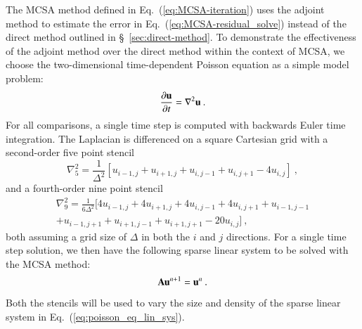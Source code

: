 \documentclass[preprint,12pt]{elsarticle}
\newcommand{\vA}{\ensuremath{\ve{A}}}
\newcommand{\vu}{\ensuremath{\ve{u}}}
\begin{document}
The MCSA method defined in Eq.~(\ref{eq:MCSA-iteration}) uses the adjoint
method to estimate the error in Eq.~(\ref{eq:MCSA-residual_solve}) instead of
the direct method outlined in \S~\ref{sec:direct-method}. To demonstrate the
effectiveness of the adjoint method over the direct method within the context
of MCSA, we choose the two-dimensional time-dependent Poisson equation as a
simple model problem:
\begin{equation}
  \frac{\partial \vu}{\partial t} = \nabla^2 \vu\:.
  \label{eq:poisson_equation}
\end{equation}
For all comparisons, a single time step is computed with backwards Euler time
integration. The Laplacian is differenced on a square Cartesian grid with a
second-order five point stencil
\begin{equation}
  \nabla^2_5 = \frac{1}{\Delta^2}[u_{i-1,j} + u_{i+1,j} + u_{i,j-1} +
    u_{i,j+1} - 4 u_{i,j}]\:,
  \label{eq:five_point_stencil}
\end{equation}
and a fourth-order nine point stencil 
\begin{multline}
  \nabla^2_9 = \frac{1}{6\Delta^2}[4 u_{i-1,j} + 4 u_{i+1,j} + 4
    u_{i,j-1} + 4 u_{i,j+1} + u_{i-1,j-1}\\ + u_{i-1,j+1} +
    u_{i+1,j-1} + u_{i+1,j+1} - 20 u_{i,j}]\:,
  \label{eq:nine_point_stencil}
\end{multline}
both assuming a grid size of $\Delta$ in both the $i$ and $j$ directions. For
a single time step solution, we then have the following sparse linear system
to be solved with the MCSA method:
\begin{equation}
  \vA \vu^{n+1} = \vu^n\:.
  \label{eq:poisson_eq_lin_sys}
\end{equation}
Both the stencils will be used to vary the size and density of the sparse
linear system in Eq.~(\ref{eq:poisson_eq_lin_sys}).
\end{document}
